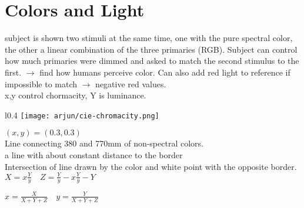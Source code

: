 \section{Colors and Light}
 subject is shown two stimuli at the same time, one with the pure spectral color, the other a linear combination of the three primaries (RGB). Subject can control how much primaries were dimmed and asked to match the second stimulus to the first. $\rightarrow$ find how humans perceive color. Can also add red light to reference if impossible to match $\rightarrow$ negative red values. \\
 x,y control chormacity, Y is luminance. 
\begin{wrapfigure}[9]{l}{0.4\columnwidth} %
    \texttt{[image: arjun/cie-chromacity.png]}
\end{wrapfigure}
 $(x,y) = (0.3,0.3)$ \\
 Line connecting 380 and 770mm of non-spectral colors. \\
 a line with about constant distance to the border \\
 Intersection of line drawn by the color and white point with the opposite border. 
$X = x \frac{Y}{y} \quad Z = \frac{Y}{y} - x \frac{Y}{y} - Y$

$x = \frac{X}{X + Y + Z} \quad y = \frac{Y}{X + Y + Z}$

